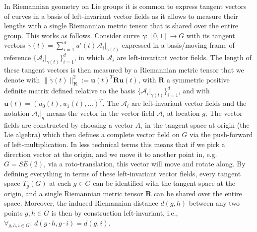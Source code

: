 \documentclass{article}
\begin{document}
In Riemannian geometry on Lie groups it is common to express tangent vectors of curves in a basis of left-invariant vector fields as it allows to measure their lengths with a single Riemannian metric tensor that is shared over the entire group. This works as follows. Consider curve $\gamma:[0,1]\rightarrow G$ with its tangent vectors $\dot{\gamma}(t) = \sum_{i=1}^d u^i(t) \mathcal{A}_i|_{\gamma(t)}$ expressed in a basis/moving frame of reference $\{\mathcal{A}_i|_{\gamma(t)}\}_{i=1}^d$, in which $\mathcal{A}_i$ are left-invariant vector fields. The length of these tangent vectors is then measured by a Riemannian metric tensor that we denote with $\lVert \dot{\gamma}(t) \rVert_{\mathbf{R}}^2 := \mathbf{u}(t)^T \mathbf{R} \mathbf{u}(t)$, with $\mathbf{R}$ a symmetric positive definite matrix defined relative to the basis $\{\mathcal{A}_i|_{\gamma(t)}\}_{i=1}^d$, and with $\mathbf{u}(t) = (u_0(t), u_1(t), \dots )^T$. The $\mathcal{A}_i$ are left-invariant vector fields and the notation $\mathcal{A}_i|_{g}$ means the vector in the vector field $\mathcal{A}_i$ at location $g$. The vector fields are constructed by choosing a vector $A_i$ in the tangent space at origin (the Lie algebra) which then defines a complete vector field on $G$ via the push-forward of left-multiplication. In less technical terms this means that if we pick a direction vector at the origin, and we move it to another point in, e.g. $G=SE(2)$, via a roto-translation, this vector will move and rotate along. By defining everything in terms of these left-invariant vector fields, every tangent space $T_g(G)$ at each $g \in G$ can be identified with the tangent space at the origin, and a single Riemannian metric tensor $\mathbf{R}$ can be shared over the entire space. Moreover, the induced Riemannian distance $d(g,h)$ between any two points $g,h \in G$ is then by construction left-invariant, i.e., $\forall_{g,h,i \in G}:\, d(g \cdot h, g \cdot i) = d(g,i)$.
\end{document}
